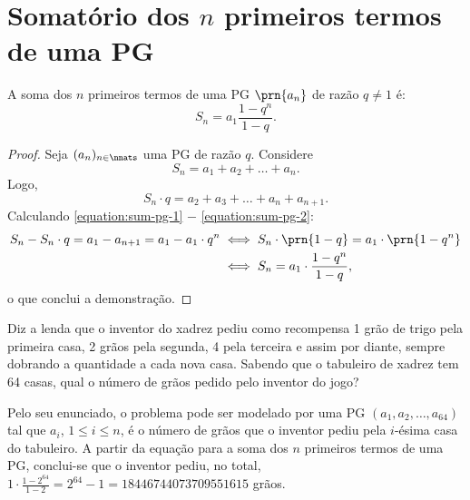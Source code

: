 \section{Somatório dos $n$ primeiros termos de uma PG}

\begin{proposition}
A soma dos $n$ primeiros termos de uma PG $\prn {a_n}$ de razão $q \ne 1$ é:
\begin{equation*}
S_n = a_1 \frac{1-q^n}{1-q}.
\end{equation*}
\end{proposition}

\begin{proof}
Seja $(a_n)_{n \in \nnats}$ uma PG de razão $q$. Considere
%
\begin{equation}
\label{equation:sum-pg-1}
S_n = a_1 + a_2 + \dots + a_n.
\end{equation}
%
Logo, 
%
\begin{equation}
\label{equation:sum-pg-2}
S_n \cdot q = a_2 + a_3 + \dots + a_n + a_{n+1}.
\end{equation}
%
Calculando \ref{equation:sum-pg-1} $-$ \ref{equation:sum-pg-2}:
%
\begin{align*}
S_n - S_n \cdot q = a_1 - a_{n+1} = a_1 - a_1 \cdot q^n & \iff S_n\cdot\prn{1-q} = a_1\cdot\prn{1-q^n} \\ &\iff S_n = a_1 \cdot \frac{1-q^n}{1-q},
\end{align*}
%
\noindent o que conclui a demonstração.

\end{proof}

\begin{example}
Diz a lenda que o inventor do xadrez pediu como recompensa 1 grão de trigo pela primeira casa, 2 grãos pela segunda, 4 pela terceira e assim por diante, sempre dobrando a quantidade a cada nova casa. 
Sabendo que o tabuleiro de xadrez tem 64 casas, qual o número de grãos pedido pelo inventor do jogo?
\end{example}

\begin{solution}
Pelo seu enunciado, o problema pode ser modelado por uma PG $(a_1, a_2, \dots, a_{64})$ tal que $a_i$, $1 \le i \le n$, é o número de grãos que o inventor pediu pela $i$-ésima casa do tabuleiro.
A partir da equação para a soma dos $n$ primeiros termos de uma PG, conclui-se que o inventor pediu, no total, $1 \cdot \frac {1 - 2^{64}} {1-2} = 2^{64}-1 = 18446744073709551615$ grãos.
\end{solution}